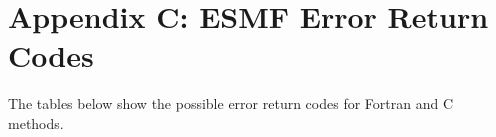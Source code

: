 %

\section{Appendix C:  ESMF Error Return Codes}

The tables below show the possible error return codes for Fortran and
C methods. 



